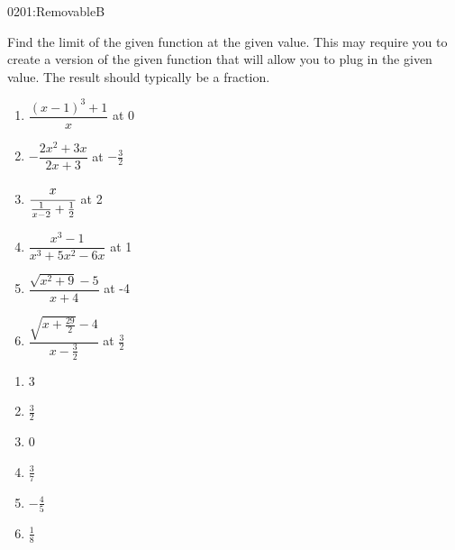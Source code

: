 \begin{defproblem}{0201:RemovableB}
\begin{onlyproblem}
\begin{exercise}
Find the limit of the given function at the given value.
This may require you to create a version of the given function that will 
allow you to plug in the given value.
The result should typically be a fraction.
\begin{enumerate}[itemsep=4pt,parsep=4pt]
\item $\dfrac{(x-1)^3+1}{x}$ at 0
\item $-\dfrac{2x^2+3x}{2x+3}$ at $-\frac{3}{2}$
\item $\cfrac{x}{\frac{1}{x-2}+\frac{1}{2}}$ at 2
\item $\dfrac{x^3-1}{x^3+5x^2-6x}$ at 1
\item $\dfrac{\sqrt{x^2+9}-5}{x+4}$ at -4
\item $\dfrac{\sqrt{x+\frac{29}{2}}-4}{x-\frac{3}{2}}$ at $\frac{3}{2}$
\end{enumerate}
\end{exercise}
\end{onlyproblem}
\begin{onlysolution}
\begin{enumerate}
\item 3
\item $\frac{3}{2}$
\item 0
\item $\frac{3}{7}$
\item $-\frac{4}{5}$
\item $\frac{1}{8}$
\end{enumerate}
\end{onlysolution}
\end{defproblem}
\endinput
